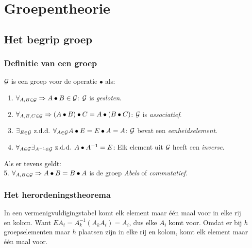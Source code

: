 \chapter{Groepentheorie}
\def\G{{\cal{G}}}
\def\HH{{\cal{H}}}
\def\II{I\hspace{-0.8ex}I}
\section{Het begrip groep}
\subsection{Definitie van een groep}
$\G$ is een groep voor de operatie $\bullet$ als:
\begin{enumerate}
\item $\forall_{A,B\in\G}\Rightarrow A\bullet B\in\G$: $\G$ is {\it gesloten}.
\item $\forall_{A,B,C\in\G}\Rightarrow (A\bullet B)\bullet C=A\bullet(B\bullet C)$: $\G$ is {\it associatief}.
\item $\exists_{E\in\G}\mbox{ z.d.d. }\forall_{A\in\G}A\bullet E=E\bullet A=A$: $\G$ bevat een {\it eenheidselement}.
\item $\forall_{A\in\G}\exists_{A^{-1}\in\G}\mbox{ z.d.d. }A\bullet A^{-1}=E$: Elk element uit $\G$ heeft een {\it inverse}.
\end{enumerate}
Als er tevens geldt:\\
\hspace*{4.5mm}5. $\forall_{A,B\in\G}\Rightarrow A\bullet B=B\bullet A$
is de groep {\it Abels} of {\it commutatief}.

\subsection{Het herordeningstheorema}
In een vermenigvuldigingstabel komt elk element maar \'e\'en maal voor in elke
rij en kolom. Want $EA_i=A_k^{-1}(A_kA_i)=A_i$, dus elke $A_i$ komt voor.
Omdat er bij $h$ groepselementen maar $h$ plaatsen zijn in elke rij en kolom,
komt elk element maar \'e\'en maal voor.

